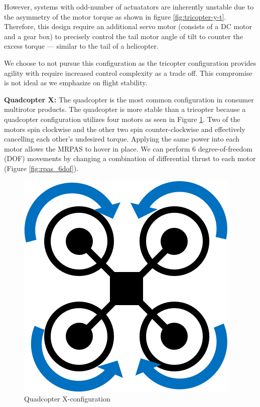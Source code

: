 However, systems with odd-number of actuatators are inherently unstable due to the asymmetry of the motor torque as shown in figure \ref{fig:tricopter-y-t}. Therefore, this design require an additional servo motor (consists of a DC motor and a gear box) to precisely control the tail motor angle of tilt to counter the excess torque --- similar to the tail of a helicopter.

We choose to not pursue this configuration as the tricopter configuration provides agility with require increased control complexity as a trade off. This compromise is not ideal as we emphasize on flight stability.

\textbf{Quadcopter X:}
The quadcopter is the most common configuration in consumer multirotor products. The quadcopter is more stable than a tricopter because a quadcopter configuration utilizes four motors as seen in Figure \ref{fig:quadcopter-x-t}. Two of the motors spin clockwise and the other two spin counter-clockwise and effectively cancelling each other’s undesired torque. Applying the same power into each motor allows the MRPAS to hover in place. We can perform 6 degree-of-freedom (DOF) movements by changing a combination of differential thrust to each motor (Figure \ref{fig:rpas_6dof}).

\begin{figure}[H]
    \centering
    \includegraphics[scale=0.4]{img/drone_xconfigt}
    \caption{Quadcopter X-configuration}
    \label{fig:quadcopter-x-t}
\end{figure}


